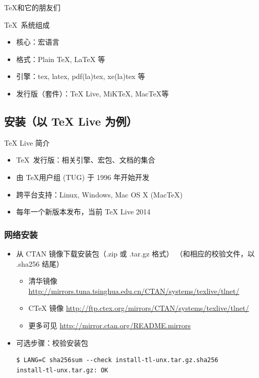 \documentclass{beamer}
\def\TeXLive{\TeX{} Live\xspace}
\let\TL=\TeXLive
\begin{document}
\begin{frame}{\TeX 和它的朋友们}
  \begin{block}{\TeX\ 系统组成}
    \begin{itemize}
      \item 核心：宏语言
      \item 格式：Plain \TeX, \alert{\LaTeX} 等
      \item 引擎：tex, latex, pdf(la)tex, \alert{xe(la)tex} 等
      \item 发行版（套件）：\alert{\TL}, MiK\TeX, Mac\TeX 等
    \end{itemize}
  \end{block}
\end{frame}

\subsection{安装（以 \TL 为例）}

\begin{frame}{\TL 简介}
  \begin{itemize}
    \item \TeX\ 发行版：相关引擎、宏包、文档的集合
    \item 由 \TeX 用户组 (TUG) 于 1996 年开始开发
    \item 跨平台支持：Linux, Windows, Mac OS X (Mac\TeX)
    \item 每年一个新版本发布，当前 \TL 2014
  \end{itemize}
\end{frame}

\begin{frame}[fragile]
  \frametitle{网络安装}
  \begin{itemize}
    \item 从 CTAN 镜像下载安装包（.zip 或 .tar.gz 格式）
（和相应的校验文件，以 .sha256 结尾）
\begin{itemize} %
  \item 清华镜像 \url{http://mirrors.tuna.tsinghua.edu.cn/CTAN/systems/texlive/tlnet/}
  \item CTeX 镜像 \url{http://ftp.ctex.org/mirrors/CTAN/systems/texlive/tlnet/}
  \item 更多可见 \url{http://mirror.ctan.org/README.mirrors}
\end{itemize}

\item 可选步骤：校验安装包
\begin{lstlisting}
$ LANG=C sha256sum --check install-tl-unx.tar.gz.sha256
install-tl-unx.tar.gz: OK
\end{lstlisting}

  \end{itemize}
\end{frame}
\end{document}
